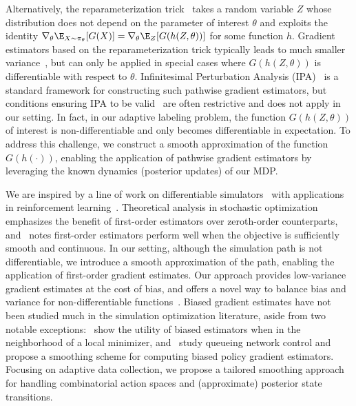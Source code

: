 Alternatively, the reparameterization trick~\citep{MaddisonMnTe17,JangGuPo17, PaulusMaKr21} 
takes a random variable $Z$ whose distribution does not depend on the parameter of interest $\theta$ and 
exploits the identity
$\nabla_\theta \E_{X \sim \pi_\theta}[G(X)]
= \nabla_\theta \E_{Z}[G(h(Z, \theta))]$ for some function $h$.
 Gradient estimators based on the reparameterization trick 
 typically leads to much smaller
variance~\citep{MohamedRoFiMn20}, 
but can only be applied in special cases where $G(h(Z, \theta))$ is differentiable with respect to $\theta$.  
Infinitesimal Perturbation Analysis (IPA)~\citep{HoEyCh83, JohnsonJa89,Glasserman90} 
is a standard framework for constructing such pathwise gradient estimators, but conditions ensuring IPA to be valid~\citep{Cao85,HeidelbergerCaZaMiSu88,Glasserman90, Glasserman92} 
are often restrictive  and does not apply in our setting. 
In fact, in our adaptive labeling problem, the function $G(h(Z, \theta))$ of interest
is non-differentiable and only becomes differentiable in expectation.
To address this challenge, we construct a smooth approximation of the function $G(h(\cdot))$, enabling the application of pathwise gradient estimators by leveraging the known dynamics (posterior updates) of our MDP.

We are inspired  by a line of work on differentiable 
simulators~\citep{deAvilaFiSmAlTeKl18,HuangHuDuZhSuTeGa21,MoraAnHaVeCo21, XuMaNaRaMaGaMa21,SuhSiZhTe22} with applications in reinforcement learning~\citep{MoraAnHaVeCo21, XuMaNaRaMaGaMa21,MadekaToEiLuFoKa22, AlvoRuKa23}.
Theoretical analysis in stochastic optimization~\citep{GhadimiLa13, MohamedRoFiMn20} emphasizes the benefit of first-order estimators over
zeroth-order counterparts, and~\citet{SuhSiZhTe22} notes first-order estimators
perform well when the objective is sufficiently smooth and continuous. 
In our setting, although the simulation path is not differentiable, we introduce a smooth approximation of the path, enabling the application of first-order gradient estimates.
Our approach provides low-variance gradient estimates at the cost of bias, and  offers a novel way to balance bias and variance for non-differentiable functions~\citep{BengioLeCo13, JangGuPo17, TuckerMnMaLaSo17}.
Biased gradient estimates have not been studied much in the simulation optimization literature, 
aside from two notable exceptions:~\citet{EckmanHe20} show the utility of biased estimators when in the neighborhood of a local minimizer, and~\citet{CheDoNa24} study queueing network control and propose a smoothing scheme for computing biased policy gradient estimators. Focusing on adaptive data collection, we propose a tailored smoothing approach for  handling combinatorial action spaces and (approximate) posterior state transitions.